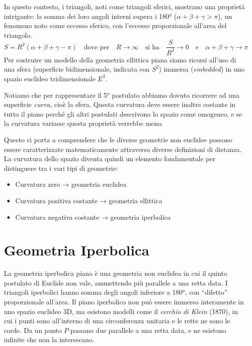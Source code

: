 \vspace{-1em}

In questo contesto, i triangoli, noti come triangoli sferici, mostrano una proprietà intrigante: la somma dei loro angoli interni supera i 180° ($\alpha + \beta + \gamma > \pi$), un fenomeno noto come eccesso sferico, con l'eccesso proporzionale all'area del triangolo.
\vspace{0.2em}
$$
S = R^2(\alpha + \beta + \gamma - \pi) \quad \text{dove per} \quad R \to \infty \quad \text{si ha} \quad \dfrac S{R^2} \to 0 \quad \text{e} \quad \alpha + \beta + \gamma \to \pi
$$
Per costruire un modello della geometria ellittica piana siamo ricorsi all'uso di una sfera (superficie bidimensionale, indicata con $S^2$) immersa (\textit{embedded}) in uno spazio euclideo tridimensionale $E^3$. 

Notiamo che per rappresentare il 5° postulato abbiamo dovuto ricorrere ad una superficie \textit{curva}, cioè la sfera. Questa curvatura deve essere inoltre costante in tutto il piano perché gli altri postulati descrivono lo spazio come omogeneo, e se la curvatura variasse questa proprietà verrebbe meno.

Questo ci porta a comprendere che le diverse geometrie non euclidee possono essere caratterizzate matematicamente attraverso diverse definizioni di distanza. La curvatura dello spazio diventa quindi un elemento fondamentale per distinguere tra i vari tipi di geometrie:
\begin{itemize}
    \item Curvatura zero → geometria euclidea
    \item Curvatura positiva costante → geometria ellittica
    \item Curvatura negativa costante → geometria iperbolica
\end{itemize}


\section{Geometria Iperbolica}

La geometria iperbolica piana è una geometria non euclidea in cui il quinto postulato di Euclide non vale, ammettendo più parallele a una retta data. I triangoli iperbolici hanno somma degli angoli inferiore a 180°, con “difetto” proporzionale all’area. Il piano iperbolico non può essere immerso interamente in uno spazio euclideo 3D, ma esistono modelli come il \emph{cerchio di Klein} (1870), in cui i punti sono all’interno di una circonferenza unitaria e le rette ne sono le corde. Da un punto $P$ passano due parallele a una retta data, e ne esistono infinite che non la intersecano.


